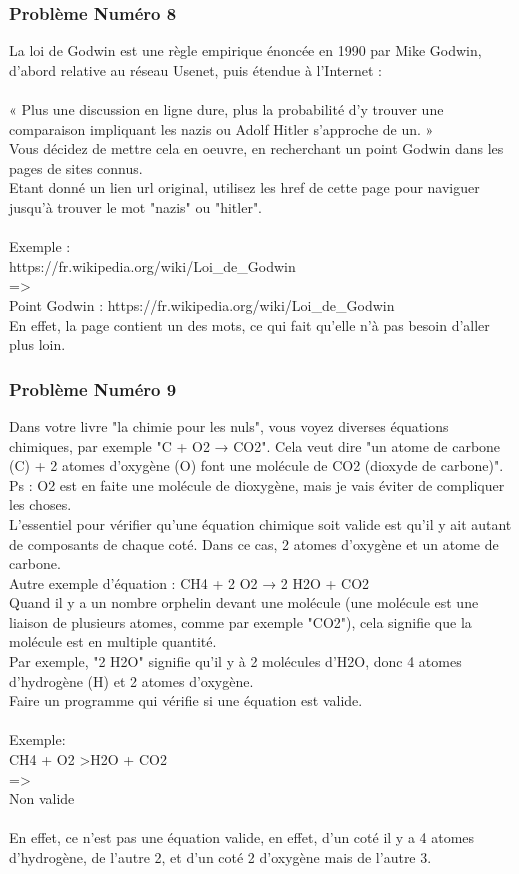 \documentclass[12pt]{article}
\begin{document}
\subsubsection{Problème Numéro 8}

La loi de Godwin est une règle empirique énoncée en 1990 par Mike Godwin, d'abord relative au réseau Usenet, puis étendue à l'Internet :
\\\\
« Plus une discussion en ligne dure, plus la probabilité d'y trouver une comparaison impliquant les nazis ou Adolf Hitler s’approche de un. »\\
Vous décidez de mettre cela en oeuvre, en recherchant un point Godwin dans les pages de sites connus.\\
Etant donné un lien url original, utilisez les href de cette page pour naviguer jusqu'à trouver le mot "nazis" ou "hitler".
\\\\
Exemple :\\
https://fr.wikipedia.org/wiki/Loi\_de\_Godwin\\
=\textgreater\\
Point Godwin : https://fr.wikipedia.org/wiki/Loi\_de\_Godwin\\
En effet, la page contient un des mots, ce qui fait qu'elle n'à pas besoin d'aller plus loin.

\subsubsection{Problème Numéro 9}

Dans votre livre "la chimie pour les nuls", vous voyez diverses équations chimiques, par exemple "C + O2 → CO2". Cela veut dire "un atome de carbone (C) + 2 atomes d'oxygène (O) font une molécule de CO2 (dioxyde de carbone)".\\
Ps : O2 est en faite une molécule de dioxygène, mais je vais éviter de compliquer les choses.\\
L'essentiel pour vérifier qu'une équation chimique soit valide est qu'il y ait autant de composants de chaque coté. Dans ce cas, 2 atomes d'oxygène et un atome de carbone.\\
Autre exemple d'équation : CH4 + 2 O2 → 2 H2O + CO2\\
Quand il y a un nombre orphelin devant une molécule (une molécule est une liaison de plusieurs atomes, comme par exemple "CO2"), cela signifie que la molécule est en multiple quantité.\\
Par exemple, "2 H2O" signifie qu'il y à 2 molécules d'H2O, donc 4 atomes d'hydrogène (H) et 2 atomes d'oxygène.\\
Faire un programme qui vérifie si une équation est valide.
\\\\
Exemple:\\
CH4 + O2 \textgreater H2O + CO2\\
=\textgreater\\
Non valide
\\\\
En effet, ce n'est pas une équation valide, en effet, d'un coté il y a 4 atomes d'hydrogène, de l'autre 2, et d'un coté 2 d'oxygène mais de l'autre 3.
\end{document}
